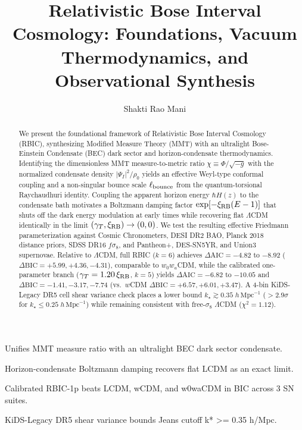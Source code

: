\documentclass[preprint,12pt]{elsarticle}
\begin{document}
\begin{frontmatter}

\title{Relativistic Bose Interval Cosmology: Foundations, Vacuum Thermodynamics, and Observational Synthesis}

\author{Shakti Rao Mani}


\begin{abstract}
We present the foundational framework of Relativistic Bose Interval Cosmology (RBIC), synthesizing Modified Measure Theory (MMT) with an ultralight Bose-Einstein Condensate (BEC) dark sector and horizon-condensate thermodynamics. Identifying the dimensionless MMT measure-to-metric ratio $\chi \equiv \Phi/\sqrt{-g}$ with the normalized condensate density $|\Psi_I|^2/\rho_0$ yields an effective Weyl-type conformal coupling and a non-singular bounce scale $\ell_{\rm bounce}$ from the quantum-torsional Raychaudhuri identity. Coupling the apparent horizon energy $\hbar H(z)$ to the condensate bath motivates a Boltzmann damping factor $\exp[-\xi_{\rm RB}(E-1)]$ that shuts off the dark energy modulation at early times while recovering flat $\Lambda$CDM identically in the limit $(\gamma_T, \xi_{\rm RB}) \to (0,0)$. We test the resulting effective Friedmann parameterization against Cosmic Chronometers, DESI DR2 BAO, Planck 2018 distance priors, SDSS DR16 $f\sigma_8$, and Pantheon+, DES-SN5YR, and Union3 supernovae. Relative to $\Lambda$CDM, full RBIC ($k=6$) achieves $\Delta\mathrm{AIC} = -4.82$ to $-8.92$ ($\Delta\mathrm{BIC} = +5.99, +4.36, -4.31$), comparable to $w_0w_a$CDM, while the calibrated one-parameter branch ($\gamma_T = 1.20\,\xi_{\rm RB}$, $k=5$) yields $\Delta\mathrm{AIC} = -6.82$ to $-10.05$ and $\Delta\mathrm{BIC} = -1.41, -3.17, -7.74$ (vs.\ $w$CDM $\Delta\mathrm{BIC} = +6.57, +6.01, +3.47$). A 4-bin KiDS-Legacy DR5 cell shear variance check places a lower bound $k_\star \gtrsim 0.35\;h\,\mathrm{Mpc}^{-1}$ ($>2.9\sigma$ for $k_\star \le 0.25\;h\,\mathrm{Mpc}^{-1}$) while remaining consistent with free-$\sigma_8$ $\Lambda$CDM ($\chi^2 = 1.12$).
\end{abstract}

\begin{highlights}
\item Unifies MMT measure ratio with an ultralight BEC dark sector condensate.
\item Horizon-condensate Boltzmann damping recovers flat LCDM as an exact limit.
\item Calibrated RBIC-1p beats LCDM, wCDM, and w0waCDM in BIC across 3 SN suites.
\item KiDS-Legacy DR5 shear variance bounds Jeans cutoff k* >= 0.35 h/Mpc.
\end{highlights}


\end{frontmatter}
\end{document}
